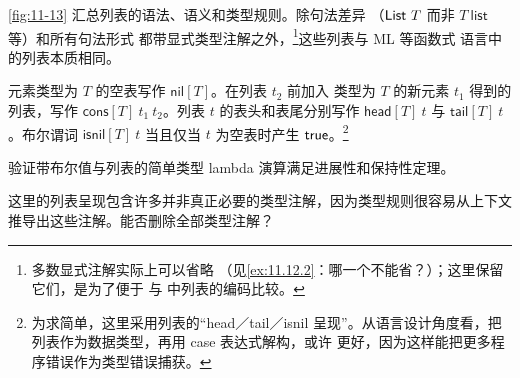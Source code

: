 \cref{fig:11-13} 汇总列表的语法、语义和类型规则。除句法差异
（\(\mathsf{List}\ T\) 而非 \(T\ \mathsf{list}\) 等）和所有句法形式
都带显式类型注解之外，\footnote{多数显式注解实际上可以省略
（见\cref{ex:11.12.2}：哪一个不能省？）；这里保留它们，是为了便于
与  中列表的编码比较。}这些列表与 ML 等函数式
语言中的列表本质相同。


元素类型为 \(T\) 的空表写作 \(\mathsf{nil}[T]\)。在列表 \(t_2\) 前加入
类型为 \(T\) 的新元素 \(t_1\) 得到的列表，写作
\(\mathsf{cons}[T]\ t_1\ t_2\)。列表 \(t\) 的表头和表尾分别写作
\(\mathsf{head}[T]\ t\) 与 \(\mathsf{tail}[T]\ t\)。布尔谓词
\(\mathsf{isnil}[T]\ t\) 当且仅当 \(t\) 为空表时产生
\(\mathsf{true}\)。\footnote{为求简单，这里采用列表的“head／tail／isnil
呈现”。从语言设计角度看，把列表作为数据类型，再用 case 表达式解构，或许
更好，因为这样能把更多程序错误作为类型错误捕获。}

\begin{exercise}[\(\star\star\star\)]
\label{ex:11.12.1}
验证带布尔值与列表的简单类型 lambda 演算满足进展性和保持性定理。
\end{exercise}

\begin{exercise}[\(\star\star\)]
\label{ex:11.12.2}
这里的列表呈现包含许多并非真正必要的类型注解，因为类型规则很容易从上下文
推导出这些注解。能否删除全部类型注解？
\end{exercise}
